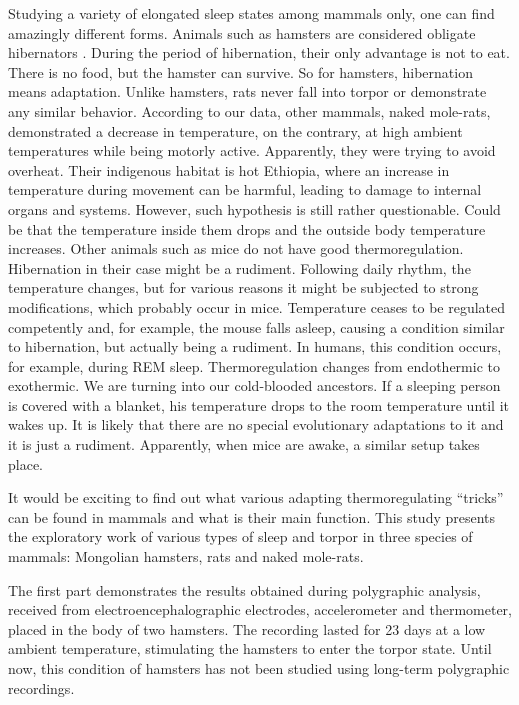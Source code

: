 \documentclass[14pt,a4paper]{scrartcl}
\begin{document}
Studying a variety of elongated sleep states among mammals only, one can find amazingly different forms. Animals such as hamsters are considered obligate hibernators \citep{Silvani2018}. During the period of hibernation, their only advantage is not to eat. There is no food, but the hamster can survive. So for hamsters, hibernation means adaptation. Unlike hamsters, rats never fall into torpor or demonstrate any similar behavior. According to our data, other mammals, naked mole-rats, demonstrated a decrease in temperature, on the contrary, at high ambient temperatures while being motorly active. Apparently, they were trying to avoid overheat. Their indigenous habitat is hot Ethiopia, where an increase in temperature during movement can be harmful, leading to damage to internal organs and systems. However, such hypothesis is still rather questionable. Could be that the temperature inside them drops and the outside body temperature increases. Other animals such as mice do not have good thermoregulation. Hibernation in their case might be a rudiment. Following daily rhythm, the temperature changes, but for various reasons it might be subjected to strong modifications, which probably occur in mice. Temperature ceases to be regulated competently and, for example, the mouse falls asleep, causing a condition similar to hibernation, but actually being a rudiment. In humans, this condition occurs, for example, during REM sleep. Thermoregulation changes from endothermic to exothermic. We are turning into our cold-blooded ancestors. If a sleeping person is сovered with a blanket, his temperature drops to the room temperature until it wakes up. It is likely that there are no special evolutionary adaptations to it and it is just a rudiment. Apparently, when mice are awake, a similar setup takes place.

It would be exciting to find out what various adapting thermoregulating “tricks” can be found in mammals and what is their main function. This study presents the exploratory work of various types of sleep and torpor in three species of mammals: Mongolian hamsters, rats and naked mole-rats.

The first part demonstrates the results obtained during polygraphic analysis, received from electroencephalographic electrodes, accelerometer and thermometer, placed in the body of two hamsters. The recording lasted for 23 days at a low ambient temperature, stimulating the hamsters to enter the torpor state. Until now, this condition of hamsters has not been studied using long-term polygraphic recordings.
\end{document}
